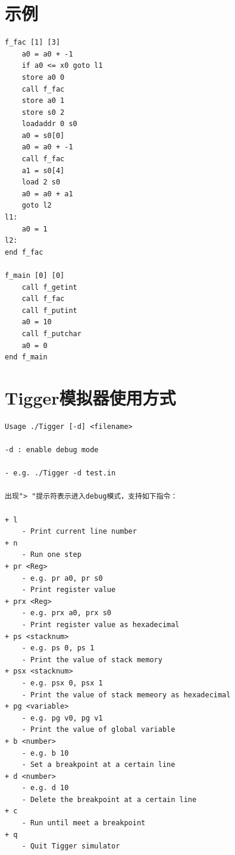 \documentclass{ctexart}
\newenvironment{typewriterfont}{\ttfamily}{\par}
\begin{document}
\newpage
\section{示例}
\begin{typewriterfont}
\begin{lstlisting}
f_fac [1] [3]
    a0 = a0 + -1
    if a0 <= x0 goto l1
    store a0 0
    call f_fac
    store a0 1
    store s0 2
    loadaddr 0 s0
    a0 = s0[0]
    a0 = a0 + -1
    call f_fac
    a1 = s0[4]
    load 2 s0
    a0 = a0 + a1
    goto l2
l1:
    a0 = 1
l2:
end f_fac

f_main [0] [0]
    call f_getint
    call f_fac
    call f_putint
    a0 = 10
    call f_putchar
    a0 = 0
end f_main
\end{lstlisting}
\end{typewriterfont}

\newpage
\section{Tigger模拟器使用方式}
\begin{typewriterfont}
\begin{lstlisting}
Usage ./Tigger [-d] <filename>

-d : enable debug mode

- e.g. ./Tigger -d test.in

出现"> "提示符表示进入debug模式，支持如下指令：

+ l
    - Print current line number
+ n
    - Run one step
+ pr <Reg>
    - e.g. pr a0, pr s0
    - Print register value
+ prx <Reg>
    - e.g. prx a0, prx s0
    - Print register value as hexadecimal
+ ps <stacknum>
    - e.g. ps 0, ps 1
    - Print the value of stack memory
+ psx <stacknum>
    - e.g. psx 0, psx 1
    - Print the value of stack memeory as hexadecimal
+ pg <variable>
    - e.g. pg v0, pg v1
    - Print the value of global variable
+ b <number>
    - e.g. b 10
    - Set a breakpoint at a certain line
+ d <number>
    - e.g. d 10
    - Delete the breakpoint at a certain line
+ c
    - Run until meet a breakpoint
+ q
    - Quit Tigger simulator
\end{lstlisting}
\end{typewriterfont}
\end{document}
